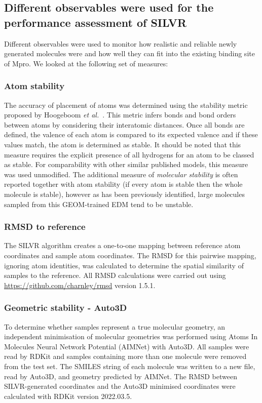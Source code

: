 \documentclass[journal=jacsat,manuscript=article]{achemso}
\begin{document}
\subsection{Different observables were used for the performance assessment of SILVR}

Different observables were used to monitor how realistic and reliable newly generated molecules were and how well they can fit into the existing binding site of Mpro. We looked at the following set of measures:

\subsubsection{Atom stability}
The accuracy of placement of atoms was determined using the stability metric proposed by Hoogeboom \textit{et al.}~\cite{hoogeboom2022equivariant}. This metric infers bonds and bond orders between atoms by considering their interatomic distances. Once all bonds are defined, the valence of each atom is compared to its expected valence and if these values match, the atom is determined as stable. It should be noted that this measure requires the explicit presence of all hydrogens for an atom to be classed as stable. For comparability with other similar published models, this measure was used unmodified. The additional measure of \textit{molecular stability} is often reported together with atom stability (if every atom is stable then the whole molecule is stable), however as has been previously identified, large molecules sampled from this GEOM-trained EDM tend to be unstable.

\subsubsection{RMSD to reference}
The SILVR algorithm creates a one-to-one mapping between reference atom coordinates and sample atom coordinates. The RMSD for this pairwise mapping, ignoring atom identities, was calculated to determine the spatial similarity of samples to the reference. All RMSD calculations were carried out using \url{https://github.com/charnley/rmsd} version 1.5.1.

\subsubsection{Geometric stability - Auto3D}
To determine whether samples represent a true molecular geometry, an independent minimisation of molecular geometries was performed using Atoms In Molecules Neural Network Potential (AIMNet) with Auto3D. All samples were read by RDKit and samples containing more than one molecule were removed from the test set. The SMILES string of each molecule was written to a new file, read by Auto3D, and geometry predicted by AIMNet. The RMSD between SILVR-generated coordinates and the Auto3D minimised coordinates were calculated with RDKit version 2022.03.5.
\end{document}
